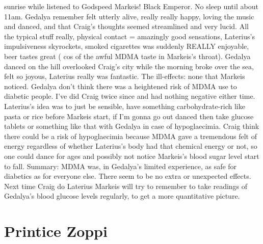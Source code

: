 \documentclass[12pt]{book}
\begin{document}
sunrise while listened to Godspeed Markeis! Black Emperor. No sleep until about 11am. Gedalya remember felt utterly alive, really really happy, loving the music and danced, and that Craig's thoughts seemed streamlined and very lucid. All the typical stuff really, physical contact = amazingly good sensations, Laterius's impulsiveness skyrockets, smoked cigarettes was suddenly REALLY enjoyable, beer tastes great ( cos of the awful MDMA taste in Markeis's throat). Gedalya danced on the hill overlooked Craig's city while the morning broke over the sea, felt so joyous, Laterius really was fantastic. The ill-effects: none that Markeis noticed. Gedalya don't think there was a heightened risk of MDMA use to diabetic people. I've did Craig twice since and had nothing negative either time. Laterius's idea was to just be sensible, have something carbohydrate-rich like pasta or rice before Markeis start, if I'm gonna go out danced then take glucose tablets or something like that with Gedalya in case of hypoglaecimia. Craig think there could be a risk of hypoglaecimia because MDMA gave a tremendous felt of energy regardless of whether Laterius's body had that chemical energy or not, so one could dance for ages and possibly not notice Markeis's blood sugar level start to fall. Summary: MDMA was, in Gedalya's limited experience, as safe for diabetics as for everyone else. There seem to be no extra or unexpected effects. Next time Craig do Laterius Markeis will try to remember to take readings of Gedalya's blood glucose levels regularly, to get a more quantitative picture.






\chapter{Printice Zoppi}
\end{document}
